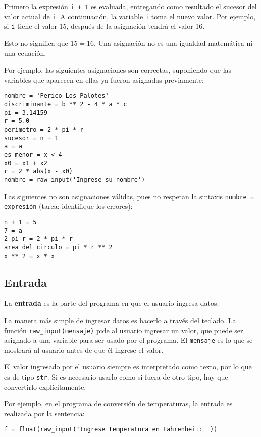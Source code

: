 Primero la expresión \lstinline!i + 1! es evaluada, entregando como
resultado el sucesor del valor actual de \lstinline!i!. A continuación,
la variable \lstinline!i! toma el nuevo valor. Por ejemplo, si
\lstinline!i! tiene el valor 15, después de la asignación tendrá el
valor 16.

Esto no significa que \(15 = 16\). Una asignación no es una igualdad
matemática ni una ecuación.

Por ejemplo, las siguientes asignaciones son correctas, suponiendo que
las variables que aparecen en ellas ya fueron asignadas previamente:

\begin{lstlisting}
nombre = 'Perico Los Palotes'
discriminante = b ** 2 - 4 * a * c
pi = 3.14159
r = 5.0
perimetro = 2 * pi * r
sucesor = n + 1
a = a
es_menor = x < 4
x0 = x1 + x2
r = 2 * abs(x - x0)
nombre = raw_input('Ingrese su nombre')
\end{lstlisting}

Las siguientes no son asignaciones válidas, pues no respetan la sintaxis
\lstinline!nombre = expresión! (tarea: identifique los errores):

\begin{lstlisting}
n + 1 = 5
7 = a
2_pi_r = 2 * pi * r
area del circulo = pi * r ** 2
x ** 2 = x * x
\end{lstlisting}

\subsection{Entrada}

La \textbf{entrada} es la parte del programa en que el usuario ingresa
datos.

La manera más simple de ingresar datos es hacerlo a través del teclado.
La función \lstinline!raw_input(mensaje)! pide al usuario ingresar un
valor, que puede ser asignado a una variable para ser usado por el
programa. El \lstinline!mensaje! es lo que se mostrará al usuario antes
de que él ingrese el valor.

El valor ingresado por el usuario siempre es interpretado como texto,
por lo que es de tipo \lstinline!str!. Si es necesario usarlo como si
fuera de otro tipo, hay que convertirlo explícitamente.

Por ejemplo, en el programa de conversión de temperaturas, la entrada es
realizada por la sentencia:

\begin{lstlisting}
f = float(raw_input('Ingrese temperatura en Fahrenheit: '))
\end{lstlisting}

